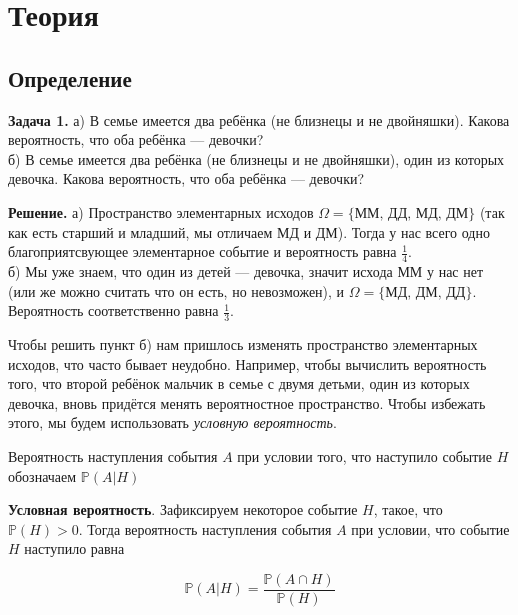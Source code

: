 
\section{Теория}

\subsection{Определение}

\begin{task}\label{task-theory-1}
\textbf{Задача 1.} а) В семье имеется два ребёнка (не близнецы и не двойняшки). Какова вероятность, что оба ребёнка  —  девочки?\\
 б) В семье имеется два ребёнка (не близнецы и не двойняшки), один из которых девочка. Какова вероятность, что оба ребёнка  —  девочки?
\end{task}

\begin{solution}\label{solution-conditional-probability-theory-1-method-1}
\textbf{Решение.} а) Пространство элементарных исходов $\Omega = \{\text{ММ, ДД, МД, ДМ}\}$ (так как есть старший и младший, мы отличаем МД и ДМ). Тогда у нас всего одно благоприятсвующее элементарное событие и вероятность равна $\frac{1}{4}$.\\
 б) Мы уже знаем, что один из детей  —  девочка, значит исхода ММ у нас нет (или же можно считать что он есть, но невозможен), и $\Omega = \{ \text{МД, ДМ, ДД}\}$. Вероятность соответственно равна $\frac{1}{3}$.\\
\end{solution}

Чтобы решить пункт б) нам пришлось изменять пространство элементарных исходов, что часто бывает неудобно. Например, чтобы вычислить вероятность того, что второй ребёнок мальчик в семье с двумя детьми, один из которых девочка, вновь придётся менять вероятностное пространство. Чтобы избежать этого, мы будем использовать \emph{условную вероятность}.

\begin{designation}
Вероятность наступления события $A$ при условии того, что наступило событие $H$ обозначаем $\mathbb{P}(A\vert H)$
\end{designation}

\begin{definition}
\textbf{Условная вероятность}. Зафиксируем некоторое событие $H$, такое, что $\mathbb{P}(H) > 0$. Тогда вероятность наступления события $A$ при условии, что событие $H$ наступило равна

\[\mathbb{P}(A\vert H) = \frac{\mathbb{P}(A\cap H)}{\mathbb{P}(H)}\]
\end{definition}

